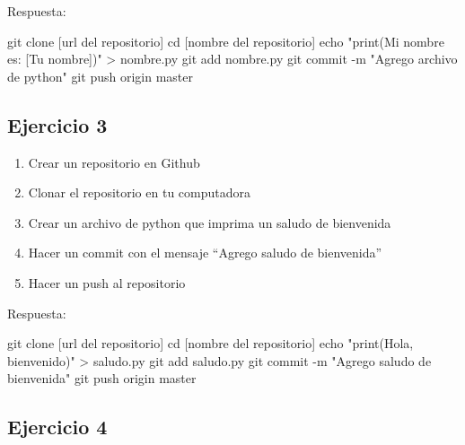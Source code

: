 \documentclass[
  a4paper,
  DIV=11,
  numbers=noendperiod,
  onepage,
  openany]{scrreprt}
\newenvironment{Shaded}{\begin{snugshade}}{\end{snugshade}}
\newcommand{\AttributeTok}[1]{\textcolor[rgb]{0.40,0.45,0.13}{#1}}
\newcommand{\BuiltInTok}[1]{\textcolor[rgb]{0.00,0.23,0.31}{#1}}
\newcommand{\FunctionTok}[1]{\textcolor[rgb]{0.28,0.35,0.67}{#1}}
\newcommand{\NormalTok}[1]{\textcolor[rgb]{0.00,0.23,0.31}{#1}}
\newcommand{\OperatorTok}[1]{\textcolor[rgb]{0.37,0.37,0.37}{#1}}
\newcommand{\StringTok}[1]{\textcolor[rgb]{0.13,0.47,0.30}{#1}}
\providecommand{\tightlist}{%
  \setlength{\itemsep}{0pt}\setlength{\parskip}{0pt}}\usepackage{longtable,booktabs,array}
\begin{document}
\begin{tcolorbox}
Respuesta:

\begin{Shaded}
\begin{Highlighting}[]
\FunctionTok{git}\NormalTok{ clone [url del repositorio]}
\BuiltInTok{cd}\NormalTok{ [nombre del repositorio]}
\BuiltInTok{echo} \StringTok{"print(\textquotesingle{}Mi nombre es: [Tu nombre]\textquotesingle{})"} \OperatorTok{\textgreater{}}\NormalTok{ nombre.py}
\FunctionTok{git}\NormalTok{ add nombre.py}
\FunctionTok{git}\NormalTok{ commit }\AttributeTok{{-}m} \StringTok{"Agrego archivo de python"}
\FunctionTok{git}\NormalTok{ push origin master}
\end{Highlighting}
\end{Shaded}

\subsection{Ejercicio 3}\label{ejercicio-3}

\begin{enumerate}
\def\labelenumi{\arabic{enumi}.}
\tightlist
\item
  Crear un repositorio en Github
\item
  Clonar el repositorio en tu computadora
\item
  Crear un archivo de python que imprima un saludo de bienvenida
\item
  Hacer un commit con el mensaje ``Agrego saludo de bienvenida''
\item
  Hacer un push al repositorio
\end{enumerate}

Respuesta:

\begin{Shaded}
\begin{Highlighting}[]
\FunctionTok{git}\NormalTok{ clone [url del repositorio]}
\BuiltInTok{cd}\NormalTok{ [nombre del repositorio]}
\BuiltInTok{echo} \StringTok{"print(\textquotesingle{}Hola, bienvenido\textquotesingle{})"} \OperatorTok{\textgreater{}}\NormalTok{ saludo.py}
\FunctionTok{git}\NormalTok{ add saludo.py}
\FunctionTok{git}\NormalTok{ commit }\AttributeTok{{-}m} \StringTok{"Agrego saludo de bienvenida"}
\FunctionTok{git}\NormalTok{ push origin master}
\end{Highlighting}
\end{Shaded}

\subsection{Ejercicio 4}\label{ejercicio-4}


\end{tcolorbox}
\end{document}
